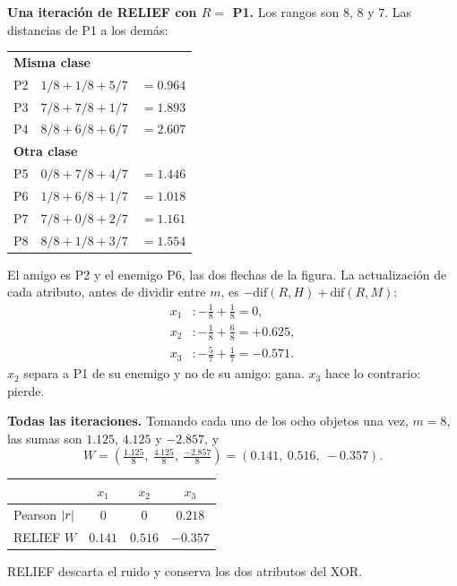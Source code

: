 \documentclass[11pt,letterpaper]{article}
\begin{document}
\begin{ejemplo}
    \textbf{Una iteración de RELIEF con $R = $ P1.} Los rangos son $8$,
    $8$ y $7$. Las distancias de P1 a los demás:
    \begin{center}
    \small
    \begin{tabular}{lll}
        \toprule
        \multicolumn{3}{l}{\textbf{Misma clase}} \\
        P2 & $1/8 + 1/8 + 5/7$ & $= 0.964$ \\
        P3 & $7/8 + 7/8 + 1/7$ & $= 1.893$ \\
        P4 & $8/8 + 6/8 + 6/7$ & $= 2.607$ \\
        \midrule
        \multicolumn{3}{l}{\textbf{Otra clase}} \\
        P5 & $0/8 + 7/8 + 4/7$ & $= 1.446$ \\
        P6 & $1/8 + 6/8 + 1/7$ & $= 1.018$ \\
        P7 & $7/8 + 0/8 + 2/7$ & $= 1.161$ \\
        P8 & $8/8 + 1/8 + 3/7$ & $= 1.554$ \\
        \bottomrule
    \end{tabular}
    \end{center}
    El amigo es P2 y el enemigo P6, las dos flechas de la figura. La
    actualización de cada atributo, antes de dividir entre $m$, es
    $-\text{dif}(R, H) + \text{dif}(R, M)$:
    \begin{align*}
        x_1 &: -\tfrac{1}{8} + \tfrac{1}{8} = 0 , \\
        x_2 &: -\tfrac{1}{8} + \tfrac{6}{8} = +0.625 , \\
        x_3 &: -\tfrac{5}{7} + \tfrac{1}{7} = -0.571 .
    \end{align*}
    $x_2$ separa a P1 de su enemigo y no de su amigo: gana. $x_3$ hace
    lo contrario: pierde.

    \textbf{Todas las iteraciones.} Tomando cada uno de los ocho objetos
    una vez, $m = 8$, las sumas son $1.125$, $4.125$ y $-2.857$, y
    \[
        W = \left(\tfrac{1.125}{8},\ \tfrac{4.125}{8},\
                  \tfrac{-2.857}{8}\right)
          = (0.141,\ 0.516,\ -0.357) .
    \]
    \begin{center}
    \small
    \begin{tabular}{lccc}
        \toprule
        & $x_1$ & $x_2$ & $x_3$ \\
        \midrule
        Pearson $\left\lvert r \right\rvert$ & $0$ & $0$ & $0.218$ \\
        RELIEF $W$        & $0.141$ & $0.516$ & $-0.357$ \\
        \bottomrule
    \end{tabular}
    \end{center}
    RELIEF descarta el ruido y conserva los dos atributos del XOR.
\end{ejemplo}
\end{document}
